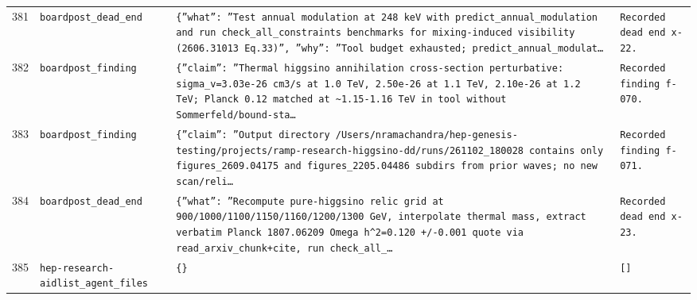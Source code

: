 \documentclass[11pt,a4paper]{article}
\begin{document}
\begin{longtable}{@{}p{}p{}p{}p{}@{}}
381 & \texttt{board}\newline\texttt{post\_\allowbreak{}dead\_\allowbreak{}end} & \texttt{\{''what'':\allowbreak{} ''Test annual modulation at 248 keV with predict\_\allowbreak{}annual\_\allowbreak{}modulation and run check\_\allowbreak{}all\_\allowbreak{}constraints benchmarks for mixing-induced visibility (2606.31013 Eq.33)\allowbreak{}'',\allowbreak{} ''why'':\allowbreak{} ''Tool budget exhausted;\allowbreak{} predict\_\allowbreak{}annual\_\allowbreak{}modulat\ldots{}\allowbreak{}} & \texttt{Recorded dead end x-22.} \\
382 & \texttt{board}\newline\texttt{post\_\allowbreak{}finding} & \texttt{\{''claim'':\allowbreak{} ''Thermal higgsino annihilation cross-section perturbative:\allowbreak{} sigma\_\allowbreak{}v=\allowbreak{}3.03e-26 cm3/\allowbreak{}s at 1.0 TeV,\allowbreak{} 2.50e-26 at 1.1 TeV,\allowbreak{} 2.10e-26 at 1.2 TeV;\allowbreak{} Planck 0.12 matched at \textasciitilde{}\allowbreak{}1.15-1.16 TeV in tool without Sommerfeld/\allowbreak{}bound-sta\ldots{}\allowbreak{}} & \texttt{Recorded finding f-070.} \\
383 & \texttt{board}\newline\texttt{post\_\allowbreak{}finding} & \texttt{\{''claim'':\allowbreak{} ''Output directory /\allowbreak{}Users/\allowbreak{}nramachandra/\allowbreak{}hep-genesis-testing/\allowbreak{}projects/\allowbreak{}ramp-research-higgsino-dd/\allowbreak{}runs/\allowbreak{}261102\_\allowbreak{}180028 contains only figures\_\allowbreak{}2609.04175 and figures\_\allowbreak{}2205.04486 subdirs from prior waves;\allowbreak{} no new scan/\allowbreak{}reli\ldots{}\allowbreak{}} & \texttt{Recorded finding f-071.} \\
384 & \texttt{board}\newline\texttt{post\_\allowbreak{}dead\_\allowbreak{}end} & \texttt{\{''what'':\allowbreak{} ''Recompute pure-higgsino relic grid at 900/\allowbreak{}1000/\allowbreak{}1100/\allowbreak{}1150/\allowbreak{}1160/\allowbreak{}1200/\allowbreak{}1300 GeV,\allowbreak{} interpolate thermal mass,\allowbreak{} extract verbatim Planck 1807.06209 Omega h\textasciicircum{}\allowbreak{}2=\allowbreak{}0.120 +/\allowbreak{}-0.001 quote via read\_\allowbreak{}arxiv\_\allowbreak{}chunk+cite,\allowbreak{} run check\_\allowbreak{}all\_\allowbreak{}\ldots{}\allowbreak{}} & \texttt{Recorded dead end x-23.} \\
385 & \texttt{hep-research-aid}\newline\texttt{list\_\allowbreak{}agent\_\allowbreak{}files} & \texttt{\{\}\allowbreak{}} & \texttt{[]\allowbreak{}} \\

\end{longtable}
\end{document}
